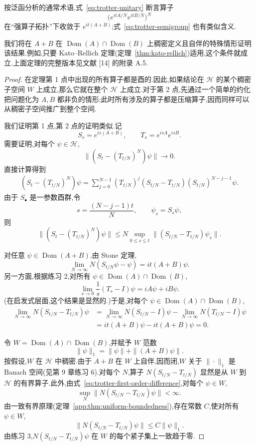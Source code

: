 按泛函分析的通常术语,式~\eqref{eq:trotter-unitary} 断言算子
\[
 \bigl(e^{itA/N}e^{itB/N}\bigr)^N
\]
在“强算子拓扑”下收敛于 $e^{it(A+B)}$;式~\eqref{eq:trotter-semigroup} 也有类似含义.

我们将在 $A+B$ 在 $\operatorname{Dom}(A)\cap\operatorname{Dom}(B)$ 上稠密定义且自伴的特殊情形证明该结果.例如,只要 Kato--Rellich 定理(定理~\ref{thm:kato-rellich})适用,这个条件就成立.上面定理的完整版本见文献 [14] 的附录 A.5.

\begin{proof}
在定理第 1 点中出现的所有算子都是酉的.因此,如果结论在 $\mathcal H$ 的某个稠密子空间 $W$ 上成立,那么它就在整个 $\mathcal H$ 上成立.对于第 2 点,先通过一个简单的约化把问题化为 $A,B$ 都非负的情形;此时所有涉及的算子都是压缩算子,因而同样可以从稠密子空间推广到整个空间.

我们证明第 1 点,第 2 点的证明类似.记
\[
 S_s=e^{is(A+B)},\qquad T_s=e^{isA}e^{isB}.
\]
需要证明,对每个 $\psi\in\mathcal H$,
\[
 \|(S_t-(T_{t/N})^N)\psi\|\longrightarrow0.
\]
直接计算得到
\[
 \begin{aligned}
 (S_t-(T_{t/N})^N)\psi
 =\sum_{j=0}^{N-1}
 (T_{t/N})^j(S_{t/N}-T_{t/N})(S_{t/N})^{N-j-1}\psi.
 \end{aligned}\label{eq:trotter-telescoping}
\]
由于 $S_\bullet$ 是一参数酉群,令
\[
 s=\frac{(N-j-1)t}{N},\qquad \psi_s=S_s\psi,
\]
则
\[
 \|(S_t-(T_{t/N})^N)\psi\|
 \le N\sup_{0\le s\le t}
 \|(S_{t/N}-T_{t/N})\psi_s\|.\label{eq:trotter-uniform-bound}
\]

对任意 $\psi\in\operatorname{Dom}(A+B)$,由 Stone 定理,
\[
 \lim_{N\to\infty}N(S_{t/N}\psi-\psi)=it(A+B)\psi.
\]
另一方面,根据练习 2,对所有 $\psi\in\operatorname{Dom}(A)\cap\operatorname{Dom}(B)$,
\[
 \lim_{s\to0}\frac1s(T_s-I)\psi=iA\psi+iB\psi.\label{eq:trotter-first-order}
\]
(在启发式层面,这个结果是显然的.)于是,对每个 $\psi\in\operatorname{Dom}(A)\cap\operatorname{Dom}(B)$,
\[
\begin{aligned}
 \lim_{N\to\infty}N(S_{t/N}-T_{t/N})\psi
 &=\lim_{N\to\infty}N(S_{t/N}-I)\psi
  -\lim_{N\to\infty}N(T_{t/N}-I)\psi\\
 &=it(A+B)\psi-it(A+B)\psi=0.\label{eq:trotter-first-order-difference}
\end{aligned}
\]

令 $W=\operatorname{Dom}(A)\cap\operatorname{Dom}(B)$,并赋予 $W$ 范数
\[
 \|\psi\|_1=\|\psi\|+\|(A+B)\psi\|.
\]
按假设,$W$ 在 $\mathcal H$ 中稠密.由于 $A+B$ 在 $W$ 上自伴,因而闭,$W$ 关于 $\|\cdot\|_1$ 是 Banach 空间(见第 9 章练习 6).对每个 $N$,算子 $N(S_{t/N}-T_{t/N})$ 显然是从 $W$ 到 $\mathcal H$ 的有界算子.此外,由式~\eqref{eq:trotter-first-order-difference},对每个 $\psi\in W$,
\[
 \sup_N\|N(S_{t/N}-T_{t/N})\psi\|<\infty.
\]
由一致有界原理(定理~\ref{app:thm:uniform-boundedness}),存在常数 $C$,使对所有 $\psi\in W$,
\[
 \|N(S_{t/N}-T_{t/N})\psi\|\le C\|\psi\|_1.
\]
由练习 3,$N(S_{t/N}-T_{t/N})\psi$ 在 $W$ 的每个紧子集上一致趋于零.


\end{proof}
